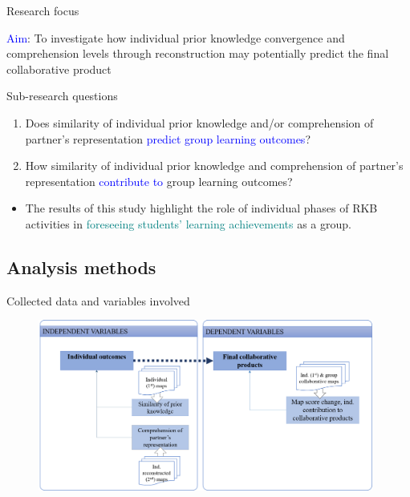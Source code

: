 \begin{frame}{Research focus}

\textcolor<1>{blue}{Aim}: To investigate how individual prior knowledge convergence and comprehension levels through reconstruction may potentially predict the final collaborative product

\begin{block}{Sub-research questions}
    \begin{enumerate}
        \item <+-> Does similarity of individual prior knowledge and/or comprehension 
              of partner's representation \textcolor{blue}{predict group learning outcomes}?
        \item <+-> How similarity of individual prior knowledge and comprehension
              of partner's representation \textcolor{blue}{contribute to} group learning outcomes?
    \end{enumerate}
\end{block}

\begin{itemize}
    \item <+->{\small The results of this study highlight the role of individual phases of RKB activities in \textcolor{teal}{foreseeing students’ learning achievements} as a group.}

\end{itemize}
    
\end{frame}



\subsection{Analysis methods}
\begin{frame}{Collected data and variables involved}
    \begin{figure}[tb]
    \begin{center}
        \includegraphics[width=110mm]{images/rqc_variables.png}
    \end{center}
    \end{figure}
\end{frame}

